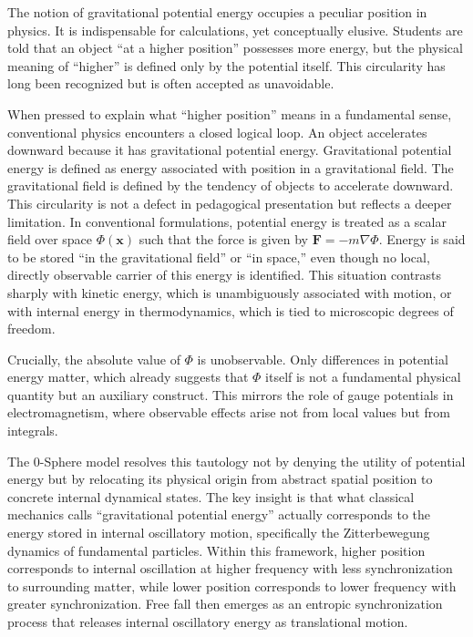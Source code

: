 \documentclass[%
 reprint,
 amsmath,amssymb,
 aps,
 prb,
]{revtex4-2}
\numberwithin{equation}{section}
\begin{document}
The notion of gravitational potential energy occupies a peculiar position in physics. It is indispensable for calculations, yet conceptually elusive. Students are told that an object ``at a higher position'' possesses more energy, but the physical meaning of ``higher'' is defined only by the potential itself. This circularity has long been recognized but is often accepted as unavoidable.

When pressed to explain what ``higher position'' means in a fundamental sense, conventional physics encounters a closed logical loop. An object accelerates downward because it has gravitational potential energy. Gravitational potential energy is defined as energy associated with position in a gravitational field. The gravitational field is defined by the tendency of objects to accelerate downward. This circularity is not a defect in pedagogical presentation but reflects a deeper limitation. In conventional formulations, potential energy is treated as a scalar field over space $\Phi(\mathbf{x})$ such that the force is given by $\mathbf{F} = - m \nabla \Phi$. Energy is said to be stored ``in the gravitational field'' or ``in space,'' even though no local, directly observable carrier of this energy is identified. This situation contrasts sharply with kinetic energy, which is unambiguously associated with motion, or with internal energy in thermodynamics, which is tied to microscopic degrees of freedom.

Crucially, the absolute value of $\Phi$ is unobservable. Only differences in potential energy matter, which already suggests that $\Phi$ itself is not a fundamental physical quantity but an auxiliary construct. This mirrors the role of gauge potentials in electromagnetism, where observable effects arise not from local values but from integrals.

The 0-Sphere model resolves this tautology not by denying the utility of potential energy but by relocating its physical origin from abstract spatial position to concrete internal dynamical states. The key insight is that what classical mechanics calls ``gravitational potential energy'' actually corresponds to the energy stored in internal oscillatory motion, specifically the Zitterbewegung dynamics of fundamental particles. Within this framework, higher position corresponds to internal oscillation at higher frequency with less synchronization to surrounding matter, while lower position corresponds to lower frequency with greater synchronization. Free fall then emerges as an entropic synchronization process that releases internal oscillatory energy as translational motion.
\end{document}
